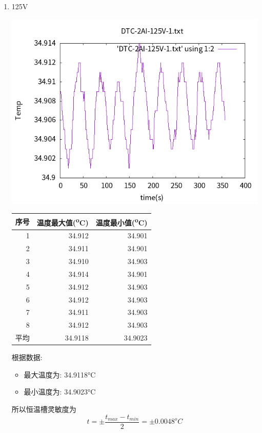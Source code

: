 \documentclass[11pt]{report}
\begin{document}
\begin{enumerate}
\item 125V
\label{sec:orge6d59e5}
\begin{center}
\includegraphics[width=.9\linewidth]{../img/DTC-2AI-125V-1.txt.png}
\end{center}
\begin{center}
\begin{tabular}{rrr}
序号 & 温度最大值(\textsuperscript{o}C) & 温度最小值(\textsuperscript{o}C)\\
\hline
1 & 34.912 & 34.901\\
2 & 34.911 & 34.901\\
3 & 34.910 & 34.903\\
4 & 34.914 & 34.901\\
5 & 34.912 & 34.903\\
6 & 34.912 & 34.903\\
7 & 34.911 & 34.903\\
8 & 34.912 & 34.903\\
平均 & 34.9118 & 34.9023\\
\end{tabular}
\end{center}

根据数据:
\begin{itemize}
\item 最大温度为: 34.9118°C
\item 最小温度为: 34.9023°C
\end{itemize}
所以恒温槽灵敏度为
\[
t=\pm\frac{t_{max}-t_{min}}{2}=\pm 0.0048^{o}C
\]
\end{enumerate}
\end{document}
